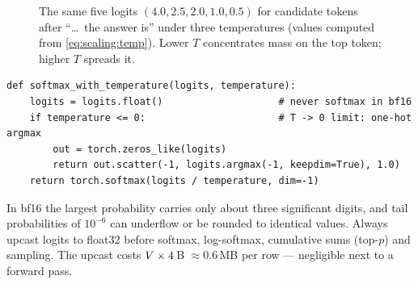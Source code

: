 \begin{figure}[t]
\centering
{}
\caption{The same five logits $(4.0, 2.5, 2.0, 1.0, 0.5)$ for candidate tokens after
``\dots\ the answer is'' under three temperatures (values computed from \cref{eq:scaling:temp}).
Lower $T$ concentrates mass on the top token; higher $T$ spreads it.}
\label{fig:scaling:tempbars}
\end{figure}

\begin{lstlisting}[caption={Temperature-scaled softmax (Lab 32, Task 1).},label={lst:scaling:temp}]
def softmax_with_temperature(logits, temperature):
    logits = logits.float()                    # never softmax in bf16
    if temperature <= 0:                       # T -> 0 limit: one-hot argmax
        out = torch.zeros_like(logits)
        return out.scatter(-1, logits.argmax(-1, keepdim=True), 1.0)
    return torch.softmax(logits / temperature, dim=-1)
\end{lstlisting}

\begin{pitfall}
In bf16 the largest probability carries only about three significant digits, and tail probabilities
of $10^{-6}$ can underflow or be rounded to identical values. Always upcast logits to float32
before softmax, log-softmax, cumulative sums (top-$p$) and sampling. The upcast costs
$V \times 4$\,B $\approx 0.6$\,MB per row --- negligible next to a forward pass.
\end{pitfall}

